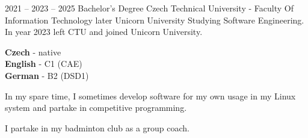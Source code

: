 \documentclass[9pt]{developercv} %
\begin{document}


\begin{entrylist}
	\entry
		{2021 -- 2023 -- 2025}
		{Bachelor's Degree}
		{Czech Technical University - Faculty Of Information Technology later Unicorn University}
		{Studying Software Engineering. In year 2023 left CTU and joined Unicorn University.}
\end{entrylist}


\begin{minipage}[t]{0.3\textwidth}
	\vspace{-\baselineskip} %

	
	\textbf{Czech} - native\\
	\textbf{English} - C1 (CAE)\\
	\textbf{German} - B2 (DSD1)
\end{minipage}
\hfill
\begin{minipage}[t]{0.3\textwidth}
	\vspace{-\baselineskip} %
	
	
	In my spare time, I sometimes develop software for my own usage in my Linux system and partake in competitive programming.
\end{minipage}
\hfill
\begin{minipage}[t]{0.3\textwidth}
	\vspace{-\baselineskip} %
	
	
	I partake in my badminton club as a group coach.
\end{minipage}

\end{document}
